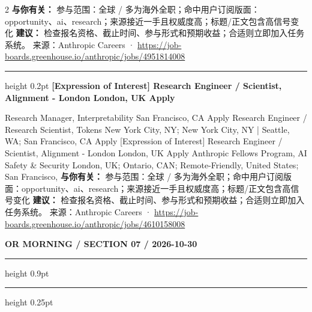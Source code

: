 \documentclass[10.5pt]{ctexart}
\begin{document}
\begin{multicols}{2}
\textbf{与你有关：} 参与范围：全球 / 多为海外全职；命中用户订阅版面：opportunity、ai、research；来源接近一手且权威度高；标题/正文包含高信号变化
\textbf{建议：} 检查报名资格、截止时间、参与形式和预期收益；合适则立即加入任务系统。
{\footnotesize\color{ormuted} 来源：Anthropic Careers · \url{https://job-boards.greenhouse.io/anthropic/jobs/4951814008}}
\vspace{2mm}
\hrule height 0.2pt
\vspace{2mm}
{\large\bfseries [Expression of Interest] Research Engineer / Scientist, Alignment - London London, UK Apply}\par
[Expression of Interest] Research Manager, Interpretability San Francisco, CA Apply Research Engineer / Research Scientist, Tokens New York City, NY; New York City, NY | Seattle, WA; San Francisco, CA Apply [Expression of Interest] Research Engineer / Scientist, Alignment - London London, UK Apply Anthropic Fellows Program, AI Safety \& Security London, UK; Ontario, CAN; Remote-Friendly, United States; San Francisco, 
\textbf{与你有关：} 参与范围：全球 / 多为海外全职；命中用户订阅版面：opportunity、ai、research；来源接近一手且权威度高；标题/正文包含高信号变化
\textbf{建议：} 检查报名资格、截止时间、参与形式和预期收益；合适则立即加入任务系统。
{\footnotesize\color{ormuted} 来源：Anthropic Careers · \url{https://job-boards.greenhouse.io/anthropic/jobs/4610158008}}
\end{multicols}
\newpage
{\small\bfseries OR MORNING / SECTION 07 / 2026-10-30}
\vspace{2mm}
\hrule height 0.9pt
\vspace{1.5mm}
\hrule height 0.25pt
\vspace{4mm}
\end{document}
